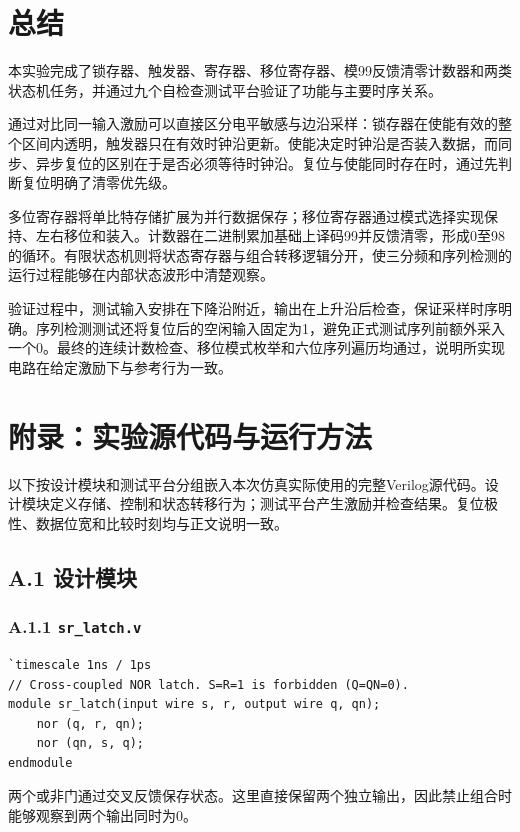 \documentclass[12pt,a4paper]{ctexart}
\begin{document}
\section{总结}
本实验完成了锁存器、触发器、寄存器、移位寄存器、模99反馈清零计数器和两类状态机任务，并通过九个自检查测试平台验证了功能与主要时序关系。

通过对比同一输入激励可以直接区分电平敏感与边沿采样：锁存器在使能有效的整个区间内透明，触发器只在有效时钟沿更新。使能决定时钟沿是否装入数据，而同步、异步复位的区别在于是否必须等待时钟沿。复位与使能同时存在时，通过先判断复位明确了清零优先级。

多位寄存器将单比特存储扩展为并行数据保存；移位寄存器通过模式选择实现保持、左右移位和装入。计数器在二进制累加基础上译码99并反馈清零，形成0至98的循环。有限状态机则将状态寄存器与组合转移逻辑分开，使三分频和序列检测的运行过程能够在内部状态波形中清楚观察。

验证过程中，测试输入安排在下降沿附近，输出在上升沿后检查，保证采样时序明确。序列检测测试还将复位后的空闲输入固定为1，避免正式测试序列前额外采入一个0。最终的连续计数检查、移位模式枚举和六位序列遍历均通过，说明所实现电路在给定激励下与参考行为一致。

\clearpage
\section*{附录：实验源代码与运行方法}
以下按设计模块和测试平台分组嵌入本次仿真实际使用的完整Verilog源代码。设计模块定义存储、控制和状态转移行为；测试平台产生激励并检查结果。复位极性、数据位宽和比较时刻均与正文说明一致。

\subsection*{A.1 设计模块}
\subsubsection*{A.1.1 \texttt{sr\_latch.v}}
\begin{lstlisting}
`timescale 1ns / 1ps
// Cross-coupled NOR latch. S=R=1 is forbidden (Q=QN=0).
module sr_latch(input wire s, r, output wire q, qn);
    nor (q, r, qn);
    nor (qn, s, q);
endmodule
\end{lstlisting}
两个或非门通过交叉反馈保存状态。这里直接保留两个独立输出，因此禁止组合时能够观察到两个输出同时为0。
\end{document}
